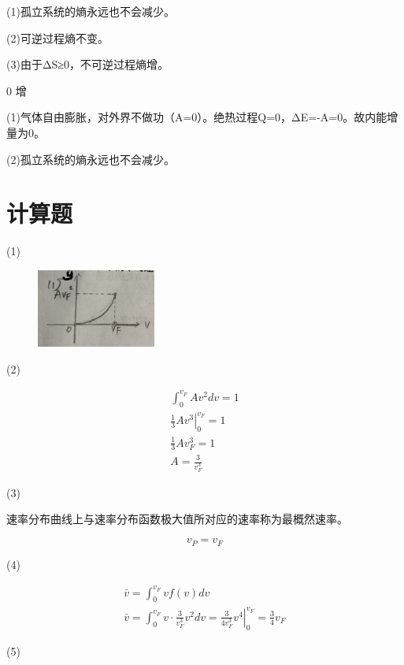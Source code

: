 \documentclass[b5paper,opensource]{./template/qyxf-book}
\begin{document}
\solve
(1)孤立系统的熵永远也不会减少。

(2)可逆过程熵不变。

(3)由于ΔS≥0，不可逆过程熵增。


0 \qquad 增

\solve(1)气体自由膨胀，对外界不做功（A=0）。绝热过程Q=0，ΔE=-A=0。故内能增量为0。

(2)孤立系统的熵永远也不会减少。


\section{计算题}

\solve
(1)
\begin{figure}[!ht]
	\centering
	\includegraphics[width=0.35\textwidth]{2_21.jpg}
\end{figure}
\newpage
(2)

$$
\begin{array} { c } { \int _ { 0 } ^ { v _ { F } } A v ^ { 2 } d v = 1 } \\ { \left. \frac { 1 } { 3 } A v ^ { 3 } \right| _ { 0 } ^ { v _ { F } } = 1 } \\ { \frac { 1 } { 3 } A v _ { F } ^ { 3 } = 1 } \\ { A = \frac { 3 } { v _ { F } ^ { 3 } } } \end{array}
$$

(3)

速率分布曲线上与速率分布函数极大值所对应的速率称为最概然速率。

$$ v_P=v_F $$

(4)

$$
\begin{array} { c } { \bar { v } = \int _ { 0 } ^ { v _ { F } } v f ( v ) d v } \\ { \bar { v } = \int _ { 0 } ^ { v _ { F } } v \cdot \frac { 3 } { v _ { F } ^ { 3 } } v ^ { 2 } d v = \left. \frac { 3 } { 4 v _ { F } ^ { 3 } } v ^ { 4 } \right| _ { 0 } ^ { v _ { F } } = \frac { 3 } { 4 } v _ { F } } \end{array}
$$

(5)
\end{document}
